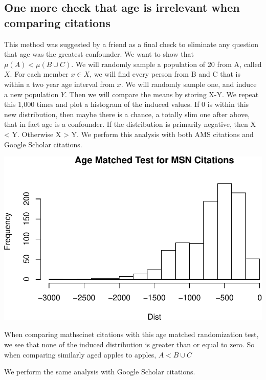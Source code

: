 \documentclass[]{article}
\begin{document}
\hypertarget{one-more-check-that-age-is-irrelevant-when-comparing-citations}{%
\subsection{One more check that age is irrelevant when comparing
citations}\label{one-more-check-that-age-is-irrelevant-when-comparing-citations}}

This method was suggested by a friend as a final check to eliminate any
question that age was the greatest confounder. We want to show that
\(\mu(A) < \mu(B \cup C)\). We will randomly sample a population of 20
from A, called \(X\). For each member \(x \in X\), we will find every
person from B and C that is within a two year age interval from \(x\).
We will randomly sample one, and induce a new population \(Y\). Then we
will compare the means by storing X-Y. We repeat this 1,000 times and
plot a histogram of the induced values. If 0 is within this new
distribution, then maybe there is a chance, a totally slim one after
above, that in fact age is a confounder. If the distribution is
primarily negative, then X \textless{} Y. Otherwise X \textgreater{} Y.
We perform this analysis with both AMS citations and Google Scholar
citations.

\includegraphics{Response_files/figure-latex/unnamed-chunk-36-1.pdf}

When comparing mathscinet citations with this age matched randomization
test, we see that none of the induced distribution is greater than or
equal to zero. So when comparing similarly aged apples to apples,
\(A < B\cup C\)

We perform the same analysis with Google Scholar citations.
\end{document}

